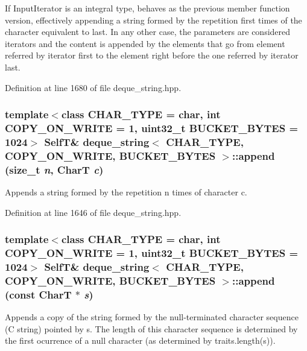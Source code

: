 If InputIterator is an integral type, behaves as the previous member function version, effectively appending a string formed by the repetition first times of the character equivalent to last. In any other case, the parameters are considered iterators and the content is appended by the elements that go from element referred by iterator first to the element right before the one referred by iterator last. 

Definition at line 1680 of file deque\_\-string.hpp.\hypertarget{classdeque__string_1b25953cd90a749e1381220ba20bb42e}{
\subsubsection[{append}]{\setlength{\rightskip}{0pt plus 5cm}template$<$class CHAR\_\-TYPE  = char, int COPY\_\-ON\_\-WRITE = 1, uint32\_\-t BUCKET\_\-BYTES = 1024$>$ {\bf SelfT}\& {\bf deque\_\-string}$<$ CHAR\_\-TYPE, COPY\_\-ON\_\-WRITE, BUCKET\_\-BYTES $>$::append (size\_\-t {\em n}, \/  CharT {\em c})}}
\label{classdeque__string_1b25953cd90a749e1381220ba20bb42e}


Appends a string formed by the repetition n times of character c. 

Definition at line 1646 of file deque\_\-string.hpp.\hypertarget{classdeque__string_bc602a34e52a44a96690152a296ffb71}{
\subsubsection[{append}]{\setlength{\rightskip}{0pt plus 5cm}template$<$class CHAR\_\-TYPE  = char, int COPY\_\-ON\_\-WRITE = 1, uint32\_\-t BUCKET\_\-BYTES = 1024$>$ {\bf SelfT}\& {\bf deque\_\-string}$<$ CHAR\_\-TYPE, COPY\_\-ON\_\-WRITE, BUCKET\_\-BYTES $>$::append (const CharT $\ast$ {\em s})}}
\label{classdeque__string_bc602a34e52a44a96690152a296ffb71}


Appends a copy of the string formed by the null-terminated character sequence (C string) pointed by s. The length of this character sequence is determined by the first ocurrence of a null character (as determined by traits.length(s)). 

